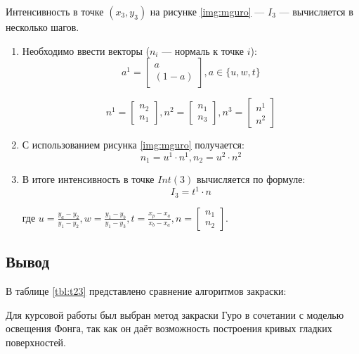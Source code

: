 Интенсивность в точке $(x_3, y_3)$ на рисунке \ref{img:mguro} --- $I_3$ --- вычисляется в несколько шагов.
\begin{enumerate}
	\item Необходимо ввести векторы ($n_i$ --- нормаль к точке $i$):
	\begin{equation}
		a^1 = \begin{bmatrix}
			a\\
			(1-a)
		\end{bmatrix}, a \in \{u, w, t\}
	\end{equation}
	
	\begin{equation}
		n^1 = \begin{bmatrix}
			n_2\\
			n_1
		\end{bmatrix},
		n^2 = \begin{bmatrix}
			n_1\\
			n_3
		\end{bmatrix},
		n^3 = \begin{bmatrix}
			n^1\\
			n^2
		\end{bmatrix}
	\end{equation}
	\item С использованием рисунка \ref{img:mguro} получается:
	\begin{equation}
		n_1 = u^1 \cdot n^1,
		n_2 = u^2 \cdot n^2
	\end{equation}
	\item В итоге интенсивность в точке $Int(3)$ вычисляется по формуле:
	\begin{equation}
		I_3 = t^1 \cdot n
	\end{equation}
	
	где $u = \frac{y_a-y_2}{y_1-y_2}, w = \frac{y_1-y_b}{y_1-y_3}, t = \frac{x_p-x_a}{x_b-x_a}, n = \begin{bmatrix}
		n_1\\
		n_2
	\end{bmatrix}.$
\end{enumerate}

\subsection*{Вывод}

В таблице \ref{tbl:t23} представлено сравнение алгоритмов закраски:


Для курсовой работы был выбран метод закраски Гуро в сочетании с моделью освещения Фонга, так как он даёт возможность построения кривых гладких поверхностей.

